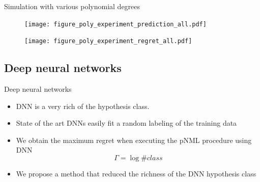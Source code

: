 \documentclass[aspectratio=169]{beamer}
\newcommand{\SubItem}[1]{
    {\setlength\itemindent{15pt} \item[-] #1}
}
\begin{document}
\begin{frame}{Simulation with various polynomial degrees}
\begin{figure}
    \vspace{-0.1cm}
    \centering
    \texttt{[image: figure\_poly\_experiment\_prediction\_all.pdf]}
    \vspace{-0.5cm}
\end{figure}
\pause
\begin{figure}
    \centering
    \texttt{[image: figure\_poly\_experiment\_regret\_all.pdf]}
\end{figure}
\end{frame}




\subsection{Deep neural networks}
\begin{frame}{Deep neural networks}
\begin{itemize}
\setlength\itemsep{2em}
\item DNN is a very rich of the hypothesis class. 
\item State of the art DNNs easily fit a random labeling of the training data~
\item We obtain the maximum regret when executing the pNML procedure using DNN
    \begin{equation}
    \Gamma = \log \# \textit{class}
    \end{equation}
\item We propose a method that reduced the richness of the DNN hypothesis class
\end{itemize}
\end{frame}
\end{document}
